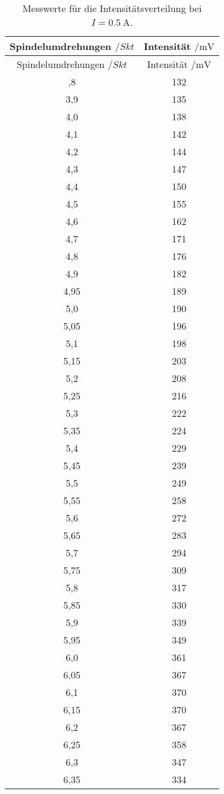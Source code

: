 \begin{longtable}{cc}
  \caption{Messwerte für die Intensitätsverteilung bei $I=\SI{0.5}{\ampere}$.}\\
  \hline
  \toprule
  Spindelumdrehungen $/Skt$ & Intensität $/\si{\milli\volt}$ \\
  \midrule
\endfirsthead
\toprule
Spindelumdrehungen $/Skt$ & Intensität $/\si{\milli\volt}$ \\
\midrule
\endhead
\bottomrule
\endfoot
\bottomrule
\bottomrule
\endlastfoot
3,8 & 132\\
3,9 & 135\\
4,0 & 138\\
4,1 & 142\\
4,2 & 144\\
4,3 & 147\\
4,4 & 150\\
4,5 & 155\\
4,6 & 162\\
4,7 & 171\\
4,8 & 176\\
4,9 & 182\\
4,95& 189\\
5,0 & 190\\
5,05& 196\\
5,1 & 198\\
5,15& 203\\
5,2 & 208\\
5,25& 216\\
5,3 & 222\\
5,35& 224\\
5,4 & 229\\
5,45& 239\\
5,5 & 249\\
5,55& 258\\
5,6 & 272\\
5,65& 283\\
5,7 & 294\\
5,75& 309\\
5,8 & 317\\
5,85& 330\\
5,9 & 339\\
5,95& 349\\
6,0 & 361\\
6,05& 367\\
6,1 & 370\\
6,15& 370\\
6,2 & 367\\
6,25& 358\\
6,3 & 347\\
6,35& 334\\

\end{longtable}
